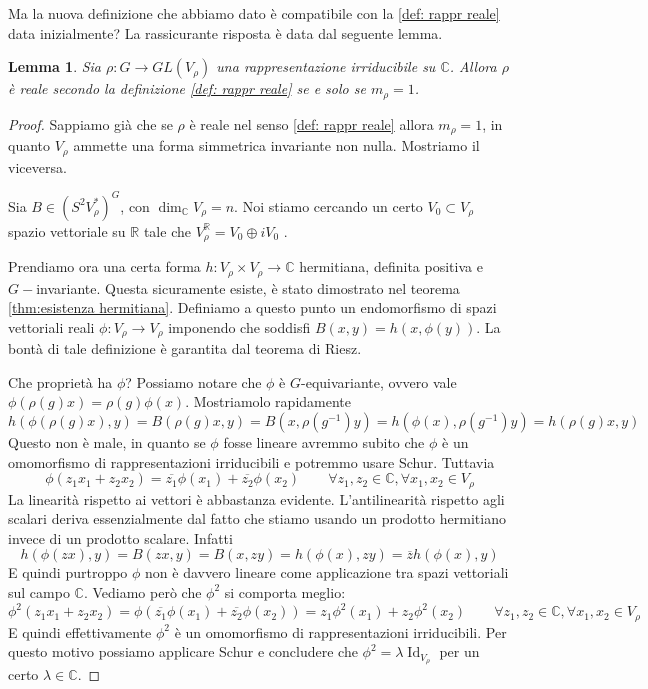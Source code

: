 \documentclass[11pt]{article}
\theoremstyle{plain}
\newtheorem{lemma}[thm]{Lemma}
\theoremstyle{definition}
\theoremstyle{remark}
\newcommand{\C}{\mathbb{C}}
\newcommand{\R}{\mathbb{R}}
\DeclareMathOperator{\Id}{Id}
\begin{document}
Ma la nuova definizione che abbiamo dato è compatibile con la \ref{def: rappr reale} data inizialmente?
La rassicurante risposta è data dal seguente lemma.
\begin{lemma}
Sia $\rho:G\to GL(V_\rho)$ una rappresentazione irriducibile su $\C$. Allora $\rho$ è reale secondo la definizione \ref{def: rappr reale} se e solo se $m_\rho = 1$.
\end{lemma}
\begin{proof}
Sappiamo già che se $\rho$ è reale nel senso \ref{def: rappr reale} allora $m_\rho = 1$, in quanto $V_\rho$ ammette una forma simmetrica invariante non nulla. Mostriamo il viceversa.

Sia $B \in (S^2V_\rho^*)^G$, con $\dim_\C V_\rho = n$.
Noi stiamo cercando un certo $V_0 \subset V_\rho$ spazio vettoriale su $\R$ tale che $V_\rho^\R = V_0 \oplus i V_0$ .






Prendiamo ora una certa forma $h : V_\rho \times V_\rho \to \C$ hermitiana, definita positiva e $G-$invariante. Questa sicuramente esiste, è stato dimostrato nel teorema \ref{thm:esistenza hermitiana}.
Definiamo a questo punto un endomorfismo di spazi vettoriali reali $\phi: V_\rho \to V_\rho$ imponendo che soddisfi $B(x, y) = h(x, \phi(y))$.
La bontà di tale definizione è garantita dal teorema di Riesz.

Che proprietà ha $\phi$? Possiamo notare che $\phi$ è $G$-equivariante, ovvero vale $\phi(\rho(g)x) = \rho(g) \phi(x)$.
Mostriamolo rapidamente
\[ h(\phi(\rho(g)x) , y) = B(\rho(g)x, y) = B(x, \rho(g^{-1} ) y) = h (\phi(x), \rho(g^{-1} ) y) = h(\rho(g)x, y)\]
Questo non è male, in quanto se $\phi$ fosse lineare avremmo subito che $\phi$ è un omomorfismo di rappresentazioni irriducibili e potremmo usare Schur. Tuttavia
\[ \phi(z_1 x_1 + z_2 x_2) = \overline{z_1} \phi(x_1) + \overline{z_2} \phi(x_2) \qquad \forall z_1, z_2 \in \C, \forall x_1, x_2 \in V_\rho\]
La linearità rispetto ai vettori è abbastanza evidente. L'antilinearità rispetto agli scalari deriva essenzialmente dal fatto che stiamo usando un prodotto hermitiano invece di un prodotto scalare. Infatti
\[ h( \phi(zx) , y) = B(zx, y) = B(x, zy) = h(\phi(x), zy) = \overline{z} h(\phi(x), y) \]
E quindi purtroppo $\phi$ non è davvero lineare come applicazione tra spazi vettoriali sul campo $\C$. Vediamo però che $\phi^2$ si comporta meglio:
\[\phi^2(z_1 x_1 + z_2 x_2) = \phi(\overline{z_1} \phi(x_1) + \overline{z_2} \phi(x_2))  = z_1 \phi^2(x_1) + z_2 \phi^2(x_2) \qquad \forall z_1, z_2 \in \C, \forall x_1, x_2 \in V_\rho \]
E quindi effettivamente $\phi^2$ è un omomorfismo di rappresentazioni irriducibili. Per questo motivo possiamo applicare Schur e concludere che
$\phi^ 2 = \lambda \Id_{V_\rho}$ per un certo $\lambda \in \C$.


\end{proof}
\end{document}
